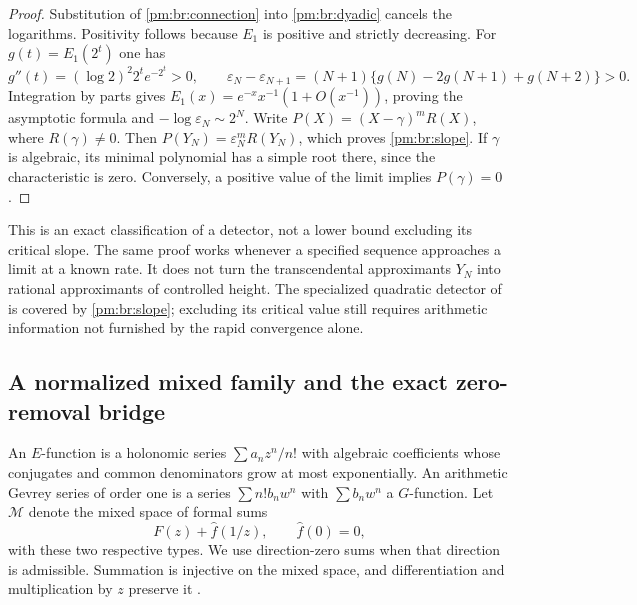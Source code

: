 \documentclass[11pt,a4paper]{article}
\theoremstyle{definition}
\theoremstyle{remark}
\numberwithin{equation}{section}
\begin{document}
\begin{proof}
Substitution of \eqref{pm:br:connection} into \eqref{pm:br:dyadic} cancels the
logarithms.  Positivity follows because \(E_1\) is positive and strictly
decreasing.  For \(g(t)=E_1(2^t)\) one has
\[
 g''(t)=(\log2)^2 2^t e^{-2^t}>0,
 \qquad
 \varepsilon_N-\varepsilon_{N+1}
 =(N+1)\{g(N)-2g(N+1)+g(N+2)\}>0.
\]
Integration by parts gives
\(E_1(x)=e^{-x}x^{-1}(1+O(x^{-1}))\), proving the asymptotic formula
and \(-\log\varepsilon_N\sim2^N\).
Write \(P(X)=(X-\gamma)^mR(X)\), where \(R(\gamma)\ne0\).
Then \(P(Y_N)=\varepsilon_N^mR(Y_N)\), which proves
\eqref{pm:br:slope}.  If \(\gamma\) is algebraic, its minimal polynomial
has a simple root there, since the characteristic is zero.  Conversely,
a positive value of the limit implies \(P(\gamma)=0\).
\end{proof}

This is an exact classification of a detector, not a lower bound excluding
its critical slope.  The same proof works whenever a specified sequence
approaches a limit at a known rate.  It does not turn the transcendental
approximants \(Y_N\) into rational approximants of controlled height.
The specialized quadratic detector of \cite{pm:KEIO002} is covered by
\eqref{pm:br:slope}; excluding its critical value still requires arithmetic
information not furnished by the rapid convergence alone.

\subsection{A normalized mixed family and the exact zero-removal bridge}

An \(E\)-function is a holonomic series
\(\sum a_nz^n/n!\) with algebraic coefficients whose conjugates and
common denominators grow at most exponentially.  An arithmetic Gevrey
series of order one is a series \(\sum n!b_nw^n\) with
\(\sum b_nw^n\) a \(G\)-function.  Let \(\mathcal M\) denote the
mixed space of formal sums
\[
 F(z)+\widehat f(1/z),\qquad \widehat f(0)=0,
\]
with these two respective types.  We use direction-zero sums when that
direction is admissible.  Summation is injective on the mixed space,
and differentiation and multiplication by \(z\) preserve it
\cite[Definition~1 and Lemma~1]{pm:FischlerRivoal2024}.
\end{document}
